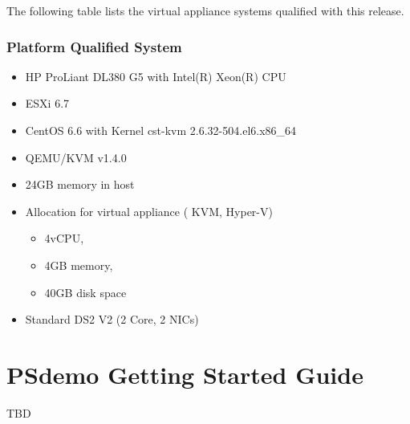 \documentclass[letterpaper,10pt,english]{sphinxmanual}
\begin{document}
The following table lists the virtual appliance systems qualified with this release.


\subsection{Platform Qualified System}
\label{\detokenize{relnotes:platform-qualified-system}}
\begin{itemize}
\item {} 
HP ProLiant DL380 G5 with Intel(R) Xeon(R) CPU

\item {} 
ESXi 6.7

\item {} 
CentOS 6.6 with Kernel cst-kvm 2.6.32-504.el6.x86\_64

\item {} 
QEMU/KVM v1.4.0

\end{itemize}

\begin{itemize}
\item {} 
24GB memory in host

\item {} 
Allocation for virtual appliance ( KVM, Hyper-V)
\begin{itemize}
\item {} 
4vCPU,

\item {} 
4GB memory,

\item {} 
40GB disk space

\end{itemize}

\item {} 
Standard DS2 V2 (2 Core, 2 NICs)

\end{itemize}


\chapter{PSdemo Getting Started Guide}
\label{\detokenize{get-started:product-name-getting-started-guide}}\label{\detokenize{get-started:doc-get-started}}\label{\detokenize{get-started::doc}}
TBD
\end{document}
